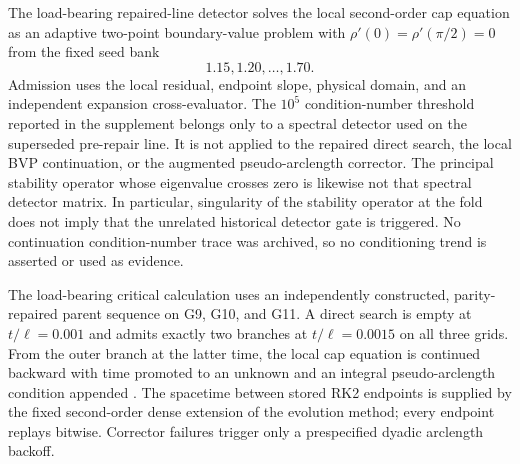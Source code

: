 \documentclass[11pt]{article}
\begin{document}
The load-bearing repaired-line detector solves the local second-order cap
equation as an adaptive two-point boundary-value problem with
$\rho'(0)=\rho'(\pi/2)=0$ from the fixed seed bank
\begin{equation}
1.15,1.20,\ldots,1.70.
\end{equation}
Admission uses the local residual, endpoint slope, physical domain, and an
independent expansion cross-evaluator.  The $10^5$ condition-number threshold
reported in the supplement belongs only to a spectral detector used on the
superseded pre-repair line.  It is not applied to the repaired direct search,
the local BVP continuation, or the augmented pseudo-arclength corrector.  The
principal stability operator whose eigenvalue crosses zero is likewise not
that spectral detector matrix.  In particular, singularity of the stability
operator at the fold does not imply that the unrelated historical detector
gate is triggered.  No continuation condition-number trace was
archived, so no conditioning trend is asserted or used as evidence.

The load-bearing critical calculation uses an independently constructed,
parity-repaired parent sequence on G9, G10, and G11.  A direct search is empty at
$t/\ell=0.001$ and admits exactly two branches at $t/\ell=0.0015$ on all
three grids.  From the outer branch at the latter time, the local cap equation
is continued backward with time promoted to an unknown and an integral
pseudo-arclength condition appended \cite{Keller1977}.  The spacetime between stored RK2
endpoints is supplied by the fixed second-order dense extension of the
evolution method; every endpoint replays bitwise.  Corrector failures trigger
only a prespecified dyadic arclength backoff.
\end{document}
